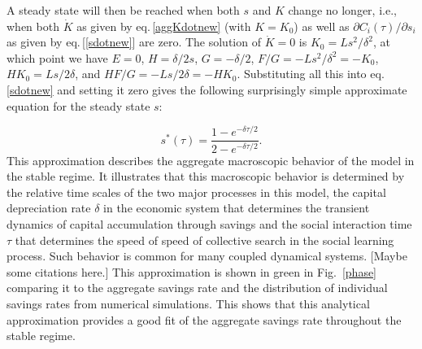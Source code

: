 A steady state will then be reached when both $s$ and $K$ change no longer, i.e., when both $\dot K$ as given by eq.\,\eqref{aggKdotnew} (with $K=K_0$) as well as $\partial C_i(\tau)/\partial s_i$ as given by eq.\,[\ref{sdotnew}]
are zero.
The solution of $\dot K = 0$ is 
$K_0 = L s^2 / \delta^2$, 
at which point we have
$E = 0$,
$H = \delta / 2 s$, 
$G = - \delta / 2$, 
$F/G = - L s^2 / \delta^2 = - K_0$, 
$H K_0 = L s / 2 \delta$, and
$H F / G = - L s / 2 \delta = - H K_0$.
Substituting all this into eq.\,\eqref{sdotnew} and setting it zero gives the following surprisingly simple approximate equation for the steady state $s$:

\begin{equation}
\label{eq:s_optimal}
s^\ast(\tau) = \frac{1 - e^{-\delta \tau/2}}{2 - e^{-\delta \tau/2}}.
\end{equation}
This approximation describes the aggregate macroscopic behavior of the model in the stable regime. It illustrates that this macroscopic behavior is determined by the relative time scales of the two major processes in this model, the capital depreciation rate $\delta$ in the economic system that determines the transient dynamics of capital accumulation through savings and the social interaction time $\tau$ that determines the speed of speed of collective search in the social learning process. Such behavior is common for many coupled dynamical systems. [Maybe some citations here.] This approximation is shown in green in Fig.~\ref{phase} comparing it to the aggregate savings rate and the distribution of individual savings rates from numerical simulations. This shows that this analytical approximation provides a good fit of the aggregate savings rate throughout the stable regime.

